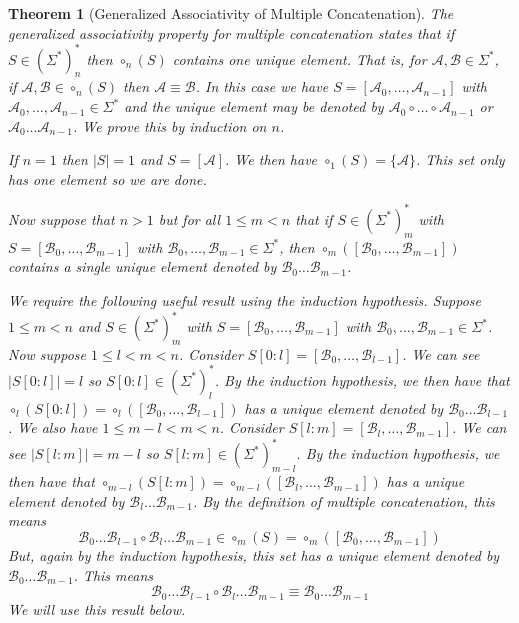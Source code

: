 \documentclass[12pt]{article}
\theoremstyle{break}
\theoremstyle{break}
\newtheorem{theorem}{Theorem}[section]
\theoremstyle{break}
\theoremstyle{break}
\theoremstyle{break}
\newtheorem{informal definition}[definition]{Informal Definition}
\newcommand{\mc}[1]{\mathcal{#1}}
\begin{document}
\begin{theorem}[Generalized Associativity of Multiple Concatenation]
The generalized associativity property for multiple concatenation states that if $S\in (\Sigma^*)_n^*$ then $\circ_n(S)$ contains one unique element.
That is, for $\mc{A}, \mc{B}\in\Sigma^*$, if $\mc{A}, \mc{B} \in \circ_n(S)$ then $\mc{A}\equiv \mc{B}$.
In this case we have $S=[\mc{A}_0,\ldots,\mc{A}_{n-1}]$ with $\mc{A}_0,\ldots,\mc{A}_{n-1}\in \Sigma^*$ and the unique element may be denoted by $\mc{A}_0\circ\ldots \circ \mc{A}_{n-1}$ or $\mc{A}_0\ldots\mc{A}_{n-1}$.
We prove this by induction on $n$.

If $n=1$ then $|S|=1$ and $S = [\mc{A}]$.
We then have $\circ_1(S) = \{\mc{A}\}$.
This set only has one element so we are done.

Now suppose that $n>1$ but for all $1\le m<n$ that if $S\in (\Sigma^*)^*_m$ with $S=[\mc{B}_0,\ldots, \mc{B}_{m-1}]$ with $\mc{B}_0, \ldots, \mc{B}_{m-1}\in\Sigma^*$, then $\circ_m([\mc{B}_0, \ldots, \mc{B}_{m-1}])$ contains a single unique element denoted by $\mc{B}_0\ldots\mc{B}_{m-1}$.

We require the following useful result using the induction hypothesis.
Suppose $1\le m < n$ and $S\in (\Sigma^*)^*_m$ with $S=[\mc{B}_0,\ldots,\mc{B}_{m-1}]$ with $\mc{B}_0,\ldots,\mc{B}_{m-1}\in\Sigma^*$.
Now suppose $1 \le l < m < n$.
Consider $S[0:l] = [\mc{B}_0, \ldots, \mc{B}_{l-1}]$.
We can see $|S[0:l]| = l$ so $S[0:l] \in (\Sigma^*)^*_l$.
By the induction hypothesis, we then have that $\circ_l(S[0:l]) = \circ_l([\mc{B}_0,\ldots, \mc{B}_{l-1}])$ has a unique element denoted by $\mc{B}_0\ldots\mc{B}_{l-1}$.
We also have $1 \le m-l < m < n$.
Consider $S[l:m] = [\mc{B}_l,\ldots, \mc{B}_{m-1}]$.
We can see $|S[l:m]| = m-l$ so $S[l:m]\in (\Sigma^*)^*_{m-l}$.
By the induction hypothesis, we then have that $\circ_{m-l}(S[l:m]) = \circ_{m-l}([\mc{B}_l,\ldots,\mc{B}_{m-1}])$ has a unique element denoted by $\mc{B}_l\ldots\mc{B}_{m-1}$.
By the definition of multiple concatenation, this means
$$
\mc{B}_0\ldots\mc{B}_{l-1}\circ \mc{B}_l\ldots\mc{B}_{m-1} \in \circ_m(S) = \circ_m([\mc{B}_0,\ldots,\mc{B}_{m-1}])
$$
But, again by the induction hypothesis, this set has a unique element denoted by $\mc{B}_0\ldots\mc{B}_{m-1}$.
This means
$$
\mc{B}_0\ldots\mc{B}_{l-1}\circ\mc{B}_l\ldots\mc{B}_{m-1} \equiv \mc{B}_0\ldots\mc{B}_{m-1}
$$
We will use this result below.


\end{theorem}
\end{document}
